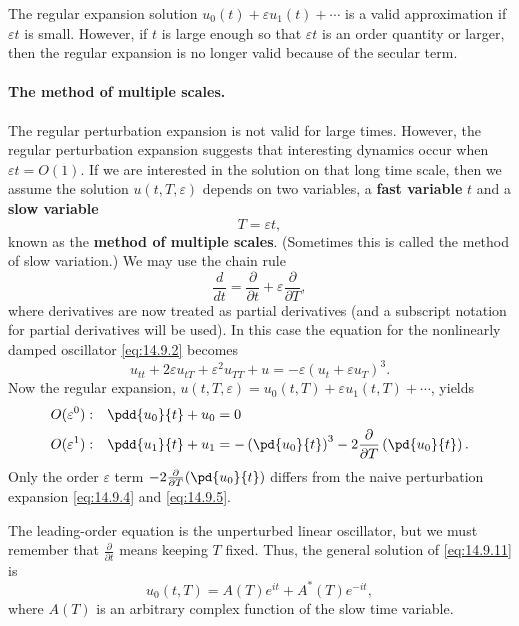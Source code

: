 The regular expansion solution $u_0(t) + \varepsilon u_1(t) + \cdots$ is a valid approximation if $\varepsilon t$ is small. However, if $t$ is large enough so that $\varepsilon t$ is an order quantity or larger, then the regular expansion is no longer valid because of the secular term.

\paragraph{The method of multiple scales.}
The regular perturbation expansion is not valid for large times. However, the regular perturbation expansion suggests that interesting dynamics occur when $\varepsilon t = O(1)$. If we are interested in the solution on that long time scale, then we assume the solution $u(t, T, \varepsilon)$ depends on two variables, a \textbf{fast variable} $t$ and a \textbf{slow variable}
\begin{equation}
\boxed{T = \varepsilon t,}
\label{eq:14.9.8}
\end{equation}
known as the \textbf{method of multiple scales}. (Sometimes this is called the method of slow variation.) We may use the chain rule
\begin{equation}
\boxed{\frac{d}{d t} = \frac{\partial}{\partial t} + \varepsilon\frac{\partial}{\partial T},}
\label{eq:14.9.9}
\end{equation}
where derivatives are now treated as partial derivatives (and a subscript notation for partial derivatives will be used). In this case the equation for the nonlinearly damped oscillator \eqref{eq:14.9.2} becomes
\begin{equation}
u_{tt} + 2\varepsilon u_{tT} + \varepsilon^2 u_{TT} + u = -\varepsilon(u_t + \varepsilon u_T)^3.
\label{eq:14.9.10}
\end{equation}
Now the regular expansion, $u(t, T, \varepsilon) = u_0(t, T) + \varepsilon u_1(t, T) + \cdots$, yields
\begin{align}
O(\varepsilon^0): \quad &\pdd{u_0}{t} + u_0 = 0 \label{eq:14.9.11} \\
O(\varepsilon^1): \quad &\pdd{u_1}{t} + u_1 = -\left(\pd{u_0}{t}\right)^3 - 2\frac{\partial}{\partial T}\left(\pd{u_0}{t}\right). \label{eq:14.9.12}
\end{align}
Only the order $\varepsilon$ term $-2\frac{\partial}{\partial T}(\pd{u_0}{t})$ differs from the naive perturbation expansion \eqref{eq:14.9.4} and \eqref{eq:14.9.5}.

The leading-order equation is the unperturbed linear oscillator, but we must remember that $\frac{\partial}{\partial t}$ means keeping $T$ fixed. Thus, the general solution of \eqref{eq:14.9.11} is
\begin{equation}
\boxed{u_0(t, T) = A(T)e^{it} + A^*(T)e^{-it},}
\label{eq:14.9.13}
\end{equation}
where $A(T)$ is an arbitrary complex function of the slow time variable.


